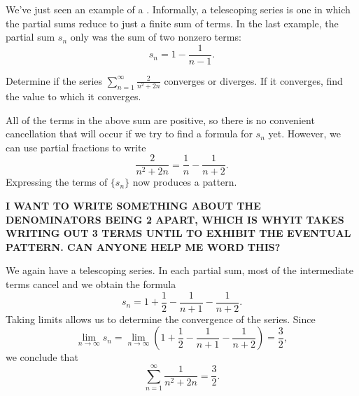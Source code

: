 \documentclass{ximera}
\begin{document}
We've just seen an example of a . Informally,
a telescoping series is one in which the partial sums reduce to just a
finite sum of terms. In the last example, the partial sum $s_n$ only was the sum of two nonzero terms: 
\[
s_n = 1 - \frac{1}{n-1}.
\]

\begin{example}
Determine if the series $\sum_{n=1}^\infty \frac{2}{n^2+2n}$ converges or diverges.  If it converges, find the value to which it converges.

\begin{explanation}
All of the terms in the above sum are positive, so there is no convenient cancellation that will occur if we try to find a formula for $s_n$ yet.  However, we can use partial fractions to write
  \[
  \frac2{n^2+2n} = \frac1n-\frac1{n+2}.
  \]  
  Expressing the terms of $\{s_n\}$ now produces a pattern.  
  \begin{image}
  \end{image}
\textbf{I WANT TO WRITE SOMETHING ABOUT THE DENOMINATORS BEING 2 APART, WHICH IS WHYIT TAKES WRITING OUT 3 TERMS UNTIL TO EXHIBIT THE EVENTUAL PATTERN.  CAN ANYONE HELP ME WORD THIS?}

We again have a telescoping series. In each partial sum, most of the intermediate 
  terms cancel and we obtain the formula
  \[
  s_n =1+\frac12-\frac1{n+1}-\frac1{n+2}.
  \]
  Taking limits allows us to determine the convergence of the series. Since
  \[
  \lim_{n\to\infty}s_n = \lim_{n\to\infty} \left(1+\frac12-\frac1{n+1}-\frac1{n+2}\right) = \frac32,
  \]
we conclude that
  \[
  \sum_{n=1}^\infty \frac1{n^2+2n} = \frac32.
  \]
\end{explanation}
\end{example}
\end{document}
